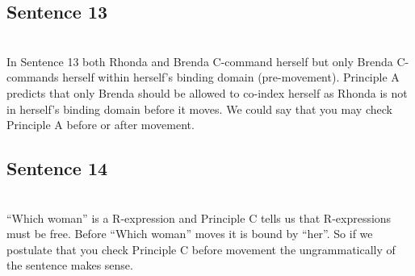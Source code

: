 \documentclass[20pt]{article}
\newcommand{\feature}[1]{\ensuremath{\left[ \text{#1} \right]}}
\newcommand{\treeScale}[0]{0.7}
\begin{document}
\subsection*{Sentence 13}
 \\
In Sentence 13 both Rhonda and Brenda C-command herself but only Brenda
C-commands herself within herself's binding domain (pre-movement). Principle A
predicts that only Brenda should be allowed to co-index herself as Rhonda is not
in herself's binding domain before it moves. We could say that you may check
Principle A before or after movement.
\subsection*{Sentence 14}
 \\
``Which woman'' is a R-expression and Principle C tells us that R-expressions
must be free. Before ``Which woman'' moves it is bound by ``her''. So if we
postulate that you check Principle C before movement the ungrammatically of the
sentence makes sense.
\end{document}
